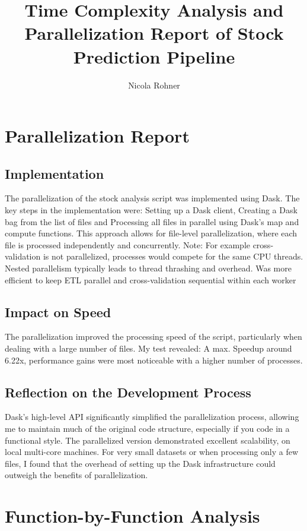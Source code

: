\documentclass[11pt,a4paper]{article}
\title{Time Complexity Analysis and Parallelization Report of Stock Prediction Pipeline}
\author{Nicola Rohner}
\begin{document}
\maketitle

\section{Parallelization Report}

\subsection{Implementation}
The parallelization of the stock analysis script was implemented using Dask. The key steps in the implementation were:
Setting up a Dask client, Creating a Dask bag from the list of files and Processing all files in parallel using Dask's map and compute functions.
This approach allows for file-level parallelization, where each file is processed independently and concurrently.
Note:
For example cross-validation is not parallelized, processes would compete for the same CPU threads. Nested parallelism typically leads to thread thrashing and overhead. Was more efficient to keep ETL parallel and cross-validation sequential within each worker

\subsection{Impact on Speed}
The parallelization improved the processing speed of the script, particularly when dealing with a large number of files. My test revealed:
A max. Speedup around 6.22x, performance gains were most noticeable with a higher number of processes.

\subsection{Reflection on the Development Process}
Dask's high-level API significantly simplified the parallelization process, allowing me to maintain much of the original code structure, especially if you code in a functional style.
The parallelized version demonstrated excellent scalability, on local multi-core machines.
For very small datasets or when processing only a few files, I found that the overhead of setting up the Dask infrastructure could outweigh the benefits of parallelization. 


\section{Function-by-Function Analysis}
\end{document}
